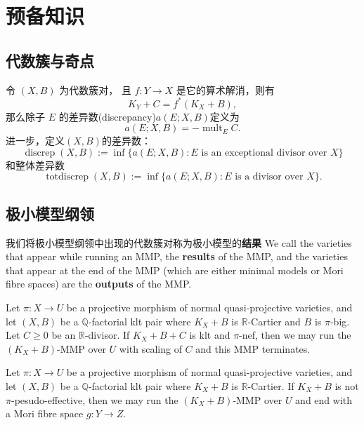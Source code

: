 \chapter{预备知识}
\section{代数簇与奇点}
\begin{definition}

	令 $(X, B)$ 为代数簇对， 且 $f: Y\to X$ 是它的算术解消，则有
	\[
		K_{Y}+C=f^*(K_{X}+B)
		,\]
	那么除子 $E$ 的差异数(discrepancy)$a(E;X,B) $定义为
	\[
		a(E;X,B)=-\operatorname{mult}_{E}C
		.\]
	进一步，定义$(X,B) $的差异数：
	\[
		\operatorname{discrep}(X, B) := \inf\{a(E; X, B) : E \text{ is an exceptional divisor over } X \}
	\]
	和整体差异数
	\[
		\operatorname{totdiscrep}(X, B) :=\operatorname{inf}\{a(E; X, B) : E \text{ is a divisor over } X\}.
	\]
\end{definition}

\section{极小模型纲领}
我们将极小模型纲领中出现的代数簇对称为极小模型的\textbf{结果}
We call the varieties that appear while running an MMP, the \textbf{results} of the MMP, and the varieties that appear at the end of the MMP (which are either minimal models or Mori fibre spaces) are the \textbf{outputs} of the MMP.

\begin{thm}
	\cite[Corollary 1.4.2]{BCHM10} Let $ \pi: X\to U $ be a projective morphism of normal quasi-projective varieties, and let $(X, B)$ be a $\mathbb{Q}$-factorial klt pair where $K_{X}+B$ is $\mathbb{R}$-Cartier and $B$ is $\pi$-big. Let $C\geqslant0$ be an $\mathbb{R}$-divisor. If $K_{X}+B+C$ is klt and  $\pi$-nef, then we may run the $(K_{X}+B)$-MMP over $U$  with scaling of $C$ and this MMP terminates.
\end{thm}

\begin{thm}\label{notpseudoeffmfs}
	\cite[Corollary 1.3.3]{BCHM10} Let $ \pi: X\to U $ be a projective morphism of normal quasi-projective varieties, and let $(X, B)$ be a $\mathbb{Q}$-factorial klt pair where $K_{X}+B$ is $\mathbb{R}$-Cartier.  If $K_{X}+B$ is  not $\pi$-pesudo-effective, then we may run the $(K_{X}+B)$-MMP over  $U$  and end with a Mori fibre space $g:Y\to Z$.
\end{thm}

